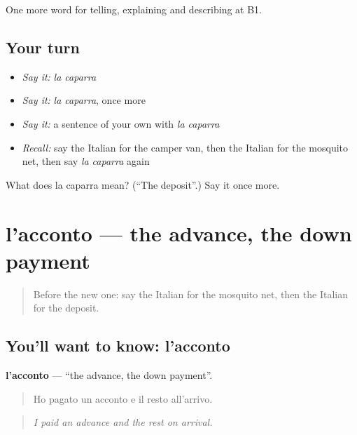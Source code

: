 \begin{grammarlens}[title={What you've built}]
One more word for telling, explaining and describing at B1.
\end{grammarlens}

\subsection*{Your turn}
\begin{itemize}
\raggedright
  \item \emph{Say it:} \emph{la caparra}
  \item \emph{Say it:} \emph{la caparra}, once more
  \item \emph{Say it:} a sentence of your own with \emph{la caparra}
  \item \emph{Recall:} say the Italian for the camper van, then the Italian for the mosquito net, then say \emph{la caparra} again
\end{itemize}

\begin{tcolorbox}[breakable,colback=teal!4,colframe=teal!35!black,title={Before you move on}]
What does la caparra mean? (\textquotedblleft{}The deposit\textquotedblright{}.) Say it once more.
\end{tcolorbox}
\section[l'acconto]{l'acconto — the advance, the down payment}

\label{lesson:IT-C431-acconto}



\begin{quote}
Before the new one: say the Italian for the mosquito net, then the Italian for the deposit.
\end{quote}

\subsection*{You'll want to know: l'acconto}
\textbf{l'acconto} — \textquotedblleft{}the advance, the down payment\textquotedblright{}.

\begin{quote}
Ho pagato un acconto e il resto all'arrivo.
\end{quote}

\begin{quote}
\emph{I paid an advance and the rest on arrival.}
\end{quote}

